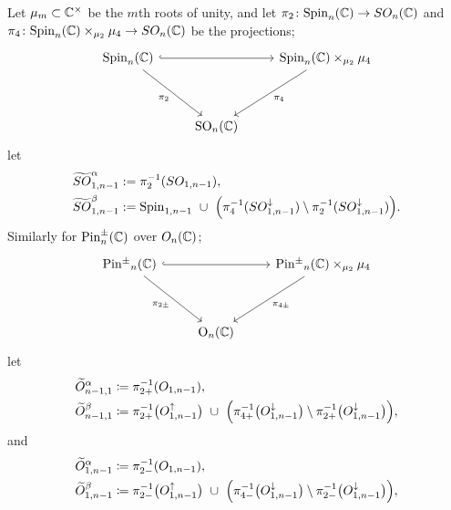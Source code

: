 \documentclass[a4paper,11pt]{article}
\begin{document}
\begin{definition}
    Let $\mu_m\subset\mathbb{C}^{\times}$ be the $m$th roots of unity, and let
    $\pi_2\colon{\rm Spin}_n(\mathbb{C})\to SO_n(\mathbb{C})$ and
    $\pi_4\colon{\rm Spin}_n(\mathbb{C})\times_{\mu_2}\mu_4\to SO_n(\mathbb{C})$ be the projections;
    \begin{equation}
        \begin{tikzcd}
        	{{\rm Spin}_n(\C)} && {{\rm Spin}_n(\C)\times_{\mu_2}\mu_4} \\
        	\\
        	& {{\rm SO}_n(\C)}
        	\arrow[hook, from=1-1, to=1-3]
        	\arrow["{\pi_2}"', from=1-1, to=3-2]
        	\arrow["{\pi_4}", from=1-3, to=3-2]
        \end{tikzcd}
    \end{equation}
    let
    \begin{align*}
        \widetilde{SO}^{\alpha}_{1,n-1} &:= \pi_2^{-1}(SO_{1,n-1}), \\
        \widetilde{SO}^{\beta}_{1,n-1} &:= {\rm Spin}_{1,n-1}\ \cup\
          \Bigl(\pi_4^{-1}(SO^{\downarrow}_{1,n-1})\setminus\pi_2^{-1}(SO^{\downarrow}_{1,n-1})\Bigr).
    \end{align*}
    Similarly for ${\rm Pin}^{\pm}_n(\mathbb{C})$ over $O_n(\mathbb{C})$;
    \begin{equation}
        \begin{tikzcd}
        	{{\rm Pin^{\pm}}_n(\C)} && {{\rm Pin^{\pm}}_n(\C)\times_{\mu_2}\mu_4} \\
        	\\
        	& {{\rm O}_n(\C)}
        	\arrow[hook, from=1-1, to=1-3]
        	\arrow["{\pi_{2\pm}}"', from=1-1, to=3-2]
        	\arrow["{\pi_{4\pm}}", from=1-3, to=3-2]
        \end{tikzcd}
    \end{equation}
    let
    \begin{align*}
        \widetilde{O}^{\alpha}_{n-1,1} &\coloneqq \pi_{2+}^{-1}(O_{1,n-1}), \\
        \widetilde{O}^{\beta}_{n-1,1}  &\coloneqq \pi_{2+}^{-1}\bigl(O^{\uparrow}_{1,n-1}\bigr)\ \cup\
          \Bigl(\pi_{4+}^{-1}\bigl(O^{\downarrow}_{1,n-1}\bigr)\setminus
                 \pi_{2+}^{-1}\bigl(O^{\downarrow}_{1,n-1}\bigr)\Bigr),
    \end{align*}
    and
    \begin{align*}
        \widetilde{O}^{\alpha}_{1,n-1} &\coloneqq \pi_{2-}^{-1}(O_{1,n-1}), \\
        \widetilde{O}^{\beta}_{1,n-1}  &\coloneqq \pi_{2-}^{-1}\bigl(O^{\uparrow}_{1,n-1}\bigr)\ \cup\
          \Bigl(\pi_{4-}^{-1}\bigl(O^{\downarrow}_{1,n-1}\bigr)\setminus
                 \pi_{2-}^{-1}\bigl(O^{\downarrow}_{1,n-1}\bigr)\Bigr),
    \end{align*}
\end{definition}
\end{document}
